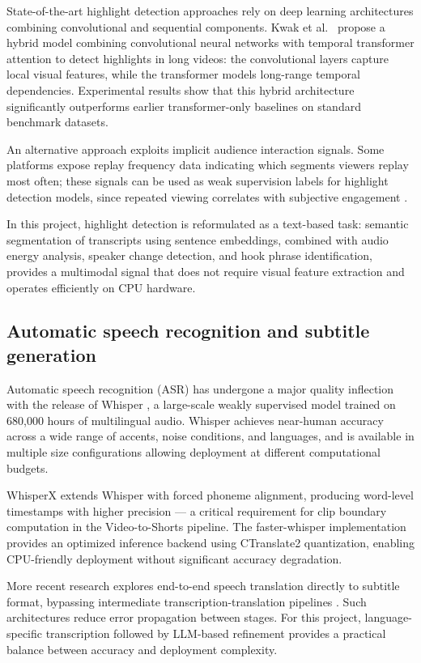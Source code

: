 \documentclass[ENG]{TFUOC}
\begin{document}
State-of-the-art highlight detection approaches rely on deep learning architectures combining convolutional and sequential components. Kwak et al.\ \cite{spot_model} propose a hybrid model combining convolutional neural networks with temporal transformer attention to detect highlights in long videos: the convolutional layers capture local visual features, while the transformer models long-range temporal dependencies. Experimental results show that this hybrid architecture significantly outperforms earlier transformer-only baselines on standard benchmark datasets.

An alternative approach exploits implicit audience interaction signals. Some platforms expose replay frequency data indicating which segments viewers replay most often; these signals can be used as weak supervision labels for highlight detection models, since repeated viewing correlates with subjective engagement \cite{video_highlight_detection}.

In this project, highlight detection is reformulated as a text-based task: semantic segmentation of transcripts using sentence embeddings, combined with audio energy analysis, speaker change detection, and hook phrase identification, provides a multimodal signal that does not require visual feature extraction and operates efficiently on CPU hardware.

\subsection*{Automatic speech recognition and subtitle generation}

Automatic speech recognition (ASR) has undergone a major quality inflection with the release of Whisper \cite{radford2023whisper}, a large-scale weakly supervised model trained on 680,000 hours of multilingual audio. Whisper achieves near-human accuracy across a wide range of accents, noise conditions, and languages, and is available in multiple size configurations allowing deployment at different computational budgets.

WhisperX \cite{bain2023whisperx} extends Whisper with forced phoneme alignment, producing word-level timestamps with higher precision — a critical requirement for clip boundary computation in the Video-to-Shorts pipeline. The faster-whisper implementation \cite{fasterwhisper} provides an optimized inference backend using CTranslate2 quantization, enabling CPU-friendly deployment without significant accuracy degradation.

More recent research explores end-to-end speech translation directly to subtitle format, bypassing intermediate transcription-translation pipelines \cite{papi2023}. Such architectures reduce error propagation between stages. For this project, language-specific transcription followed by LLM-based refinement provides a practical balance between accuracy and deployment complexity.
\end{document}
